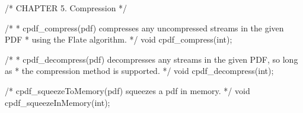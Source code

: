 /* CHAPTER 5. Compression */

/*
 * cpdf_compress(pdf) compresses any uncompressed streams in the given PDF
 * using the Flate algorithm.
 */
void cpdf_compress(int);

/*
 * cpdf_decompress(pdf) decompresses any streams in the given PDF, so long as
 * the compression method is supported.
 */
void cpdf_decompress(int);

/* cpdf_squeezeToMemory(pdf) squeezes a pdf in memory. */
void cpdf_squeezeInMemory(int);

